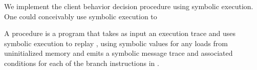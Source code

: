 %
%
%
%

We implement the client behavior decision procedure using symbolic
execution. One could conceivably use symbolic execution to 

\begin{definition}
  A procedure \symMachine{} is a program that takes as input
  an execution trace \execTrace{} and uses symbolic execution
  to replay \execTrace{}, using symbolic values for any loads from
  uninitialized memory and 
  emits a symbolic message trace \messageTrace{}
  and associated conditions for each of the branch instructions in
  \execTrace{}.
\end{definition}

